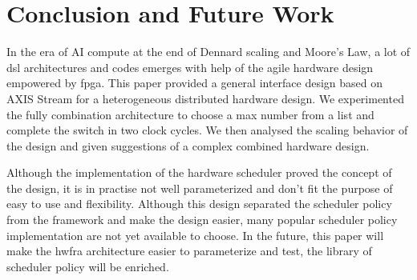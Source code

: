 \chapter{Conclusion and Future Work}
\label{sec:conclusion_and_future_work}

In the era of AI compute at the end of Dennard scaling and Moore’s Law, a lot of \gls{dsl} architectures and codes emerges with help of the agile hardware design empowered by \gls{fpga}. This paper provided a general interface design based on AXIS Stream for a heterogeneous distributed hardware design. 
We experimented the fully combination architecture to choose a max number from a list and complete the switch in two clock cycles. We then analysed the scaling behavior of the design and given suggestions of a complex combined hardware design.

Although the implementation of the hardware scheduler proved the concept of the design, it is in practise not well parameterized and don't fit the purpose of easy to use and flexibility. Although this design separated the scheduler policy from the framework and make the design easier, many popular scheduler policy implementation are not yet available to choose. In the future, this paper will make the \gls{hwfra} architecture easier to parameterize and test, the library of scheduler policy will be enriched.  


